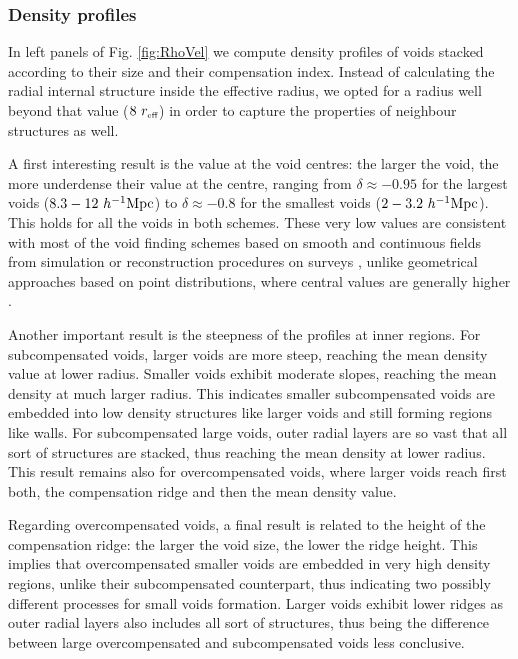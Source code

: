 \documentclass[a4,useAMS,usenatbib,usegraphicx]{mn2e}
\newcommand{\hMpc}{{\ifmmode{h^{-1}{\rm Mpc}}\else{$h^{-1}$Mpc}\fi}}
\newcommand{\reff}{{\ifmmode{r_{\mbox{\tiny eff}}}\else{$r_{\mbox{\tiny eff}}$}\fi}}
\begin{document}
\subsubsection{Density profiles}
\label{subsubsec:density_voids}


In left panels of Fig. \ref{fig:RhoVel} we compute density profiles of 
voids stacked according to their size and their compensation index. 
Instead of calculating the radial internal structure inside the effective
radius, we opted for a radius well beyond that value ($8\ \reff$) in order 
to capture the properties of neighbour structures as well. 


A first interesting result is the value at the void centres: the larger the 
void, the more underdense their value at the centre, ranging from $\delta
\approx-0.95$ for the largest voids ($8.3-12\ \hMpc$) to $\delta\approx 
-0.8$ for the smallest voids ($2-3.2\ \hMpc$). This holds for all the voids 
in both schemes. These very low values are consistent with most of the void 
finding schemes based on smooth and continuous fields from simulation or 
reconstruction procedures on surveys \citep{Plionis02, Colberg05, Shandarin06, 
Platen07, Neyrinck08, MunozCuartas11, Neyrinck13, Ricciardelli2013}, unlike
geometrical approaches based on point distributions, where central values
are generally higher \citep{Colberg08}.


Another important result is the steepness of the profiles at inner
regions. For subcompensated voids, larger voids are more steep, reaching
the mean density value at lower radius. Smaller voids exhibit moderate
slopes, reaching the mean density at much larger radius. This indicates 
smaller subcompensated voids are embedded into low density structures like 
larger voids and still forming regions like walls. For subcompensated large
voids, outer radial layers are so vast that all sort of structures are 
stacked, thus reaching the mean density at lower radius. This result 
remains also for overcompensated voids, where larger voids reach first 
both, the compensation ridge and then the mean density value.


Regarding overcompensated voids, a final result is related to the height 
of the compensation ridge: the larger the void size, the lower the ridge
height. This implies that overcompensated smaller voids are embedded in 
very high density regions, unlike their subcompensated counterpart, thus 
indicating two possibly different processes for small voids formation. 
Larger voids exhibit lower ridges as outer radial layers also includes all
sort of structures, thus being the difference between large overcompensated
and subcompensated voids less conclusive.
\end{document}
